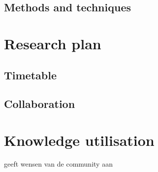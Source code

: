 \documentclass[twoside,fontsize=10pt]{article}
\renewcommand\thesection{\Roman{section}} %
\begin{document}
\subsection*{Methods and techniques} %
\section*{Research plan}
\subsection*{Timetable}
\subsection*{Collaboration}
\section*{Knowledge utilisation}
\cite{Gomez-Cabrero2014} geeft wensen van de community aan




 
%
%
\end{document}
